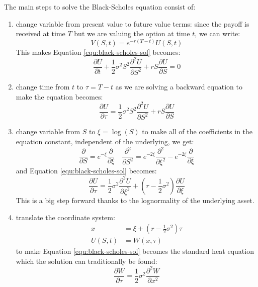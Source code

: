 The main steps to solve the Black-Scholes equation consist of:
\begin{enumerate}
	\setlength\itemsep{0em}
    \item change variable from present value to future value terms: since the payoff is received at time $T$ but we are valuing the option at time $t$, we can write:
    \begin{equation}
        V(S,t) = e^{-r(T-t)} U(S,t)
    \end{equation}    
    This makes Equation \ref{equ:black-scholes-sol} becomes:
    \begin{equation}
        \frac{\partial U}{\partial t} + \frac{1}{2} \sigma^2 S^2 \frac{\partial^2 U}{\partial S^2} + r S \frac{\partial U}{\partial S} = 0
    \end{equation}
    \item change time from $t$ to $\tau = T - t$ as we are solving a backward equation to make the equation becomes:
    \begin{equation}
        \frac{\partial U}{\partial \tau} = \frac{1}{2} \sigma^2 S^2 \frac{\partial^2 U}{\partial S^2} + r S \frac{\partial U}{\partial S}
    \end{equation}
    \item change variable from $S$ to $\xi = \log(S)$ to make all of the coefficients in the equation constant, independent of the underlying, we get:
    \begin{equation}
        \frac{\partial}{\partial S} = e^{-\xi}\frac{\partial}{\partial \xi} \quad \frac{\partial^2}{\partial S^2} = e^{-2\xi}\frac{\partial^2}{\partial \xi^2} - e^{-2\xi}\frac{\partial}{\partial \xi}
    \end{equation}
	and Equation \ref{equ:black-scholes-sol} becomes:
	\begin{equation}
	    \frac{\partial U}{\partial \tau} = \frac{1}{2} \sigma^2 \frac{\partial^2 U}{\partial \xi^2} + \left( r - \frac{1}{2} \sigma^2 \right) \frac{\partial U}{\partial \xi}
	\end{equation}
	This is a big step forward thanks to the lognormality of the underlying asset. 
    \item translate the coordinate system:
    \begin{align}
        x      &= \xi + \left( r - \frac{1}{2} \sigma^2 \right) \tau \\
        U(S,t) &= W(x,\tau)
    \end{align} 
    to make Equation \ref{equ:black-scholes-sol} becomes the standard heat equation which the solution can traditionally be found:
    \begin{equation}
        \frac{\partial W}{\partial \tau} = \frac{1}{2} \sigma^2 \frac{\partial^2 W}{\partial x^2}
        \label{equ:bs-heat}
    \end{equation}
\end{enumerate}

